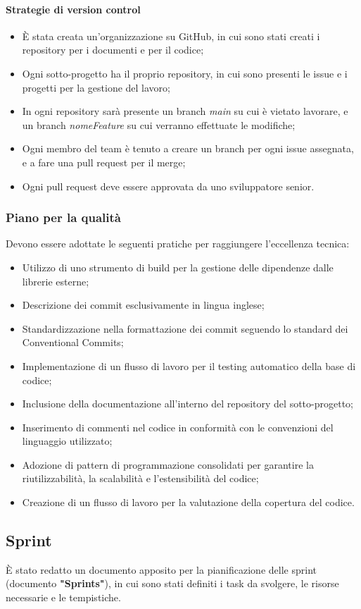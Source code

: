 \paragraph{Strategie di version control}

\begin{itemize}
    \item È stata creata un'organizzazione su GitHub, in cui sono stati creati i repository per i documenti e per il codice;
    \item Ogni sotto-progetto ha il proprio repository, in cui sono presenti le issue e i progetti per la gestione del lavoro;
    \item In ogni repository sarà presente un branch \textit{main} su cui è vietato lavorare, e un branch \textit{nomeFeature} su cui verranno effettuate le modifiche;
    \item Ogni membro del team è tenuto a creare un branch per ogni issue assegnata, e a fare una pull request per il merge;
    \item Ogni pull request deve essere approvata da uno sviluppatore senior.
\end{itemize}

\subsubsection{Piano per la qualità}

Devono essere adottate le seguenti pratiche per raggiungere l'eccellenza tecnica:

\begin{itemize}
    \item Utilizzo di uno strumento di build per la gestione delle dipendenze dalle librerie esterne;
    \item Descrizione dei commit esclusivamente in lingua inglese;
    \item Standardizzazione nella formattazione dei commit seguendo lo standard dei Conventional Commits;
    \item Implementazione di un flusso di lavoro per il testing automatico della base di codice;
    \item Inclusione della documentazione all'interno del repository del sotto-progetto;
    \item Inserimento di commenti nel codice in conformità con le convenzioni del linguaggio utilizzato;
    \item Adozione di pattern di programmazione consolidati per garantire la riutilizzabilità, la scalabilità e l'estensibilità del codice;
    \item Creazione di un flusso di lavoro per la valutazione della copertura del codice.
\end{itemize}



\subsection{Sprint}
È stato redatto un documento apposito per la pianificazione delle sprint (documento \textbf{"Sprints"}), in cui sono stati definiti i task da svolgere, le risorse necessarie e le tempistiche.